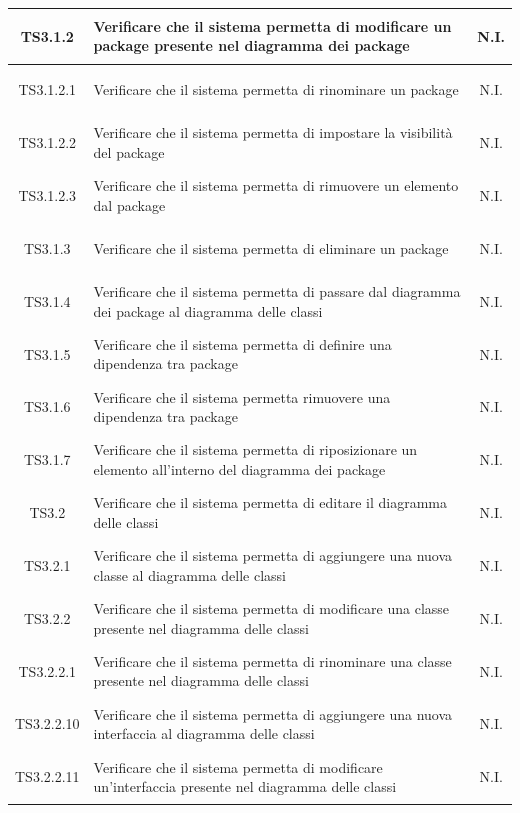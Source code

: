 \documentclass[../PianoDiQualifica.tex]{subfiles}
\begin{document}
\begin{longtable}{|c|>{\centering}p{10cm}|c|}
	\hline
	\hypertarget{TS3.1.2}{TS3.1.2} & Verificare che il sistema permetta di modificare un package presente nel diagramma dei package & N.I. \\
	\hline
	\hypertarget{TS3.1.2.1}{TS3.1.2.1} & Verificare che il sistema permetta di rinominare un package & N.I. \\
	\hline
	\hypertarget{TS3.1.2.2}{TS3.1.2.2} & Verificare che il sistema permetta di impostare la visibilità del package & N.I. \\
	\hline
	\hypertarget{TS3.1.2.3}{TS3.1.2.3} & Verificare che il sistema permetta di rimuovere un elemento dal package & N.I. \\
	\hline
	\hypertarget{TS3.1.3}{TS3.1.3} & Verificare che il sistema permetta di eliminare un package & N.I. \\
	\hline
	\hypertarget{TS3.1.4}{TS3.1.4} & Verificare che il sistema permetta di passare dal diagramma dei package al diagramma delle classi & N.I. \\
	\hline
	\hypertarget{TS3.1.5}{TS3.1.5} & Verificare che il sistema permetta di definire una dipendenza tra package & N.I. \\
	\hline
	\hypertarget{TS3.1.6}{TS3.1.6} & Verificare che il sistema permetta rimuovere una dipendenza tra package & N.I. \\
	\hline
	\hypertarget{TS3.1.7}{TS3.1.7} & Verificare che il sistema permetta di riposizionare un elemento all'interno del diagramma dei package & N.I. \\
	\hline
	\hypertarget{TS3.2}{TS3.2} & Verificare che il sistema permetta di editare il diagramma delle classi & N.I. \\
	\hline
	\hypertarget{TS3.2.1}{TS3.2.1} & Verificare che il sistema permetta di aggiungere una nuova classe al diagramma delle classi & N.I. \\
	\hline
	\hypertarget{TS3.2.2}{TS3.2.2} & Verificare che il sistema permetta di modificare una classe presente nel diagramma delle classi & N.I. \\
	\hline
	\hypertarget{TS3.2.2.1}{TS3.2.2.1} & Verificare che il sistema permetta di rinominare una classe presente nel diagramma delle classi & N.I. \\
	\hline
	\hypertarget{TS3.2.2.10}{TS3.2.2.10} & Verificare che il sistema permetta di aggiungere una nuova interfaccia al diagramma delle classi & N.I. \\
	\hline
	\hypertarget{TS3.2.2.11}{TS3.2.2.11} & Verificare che il sistema permetta di modificare un'interfaccia presente nel diagramma delle classi & N.I. \\

\end{longtable}
\end{document}
